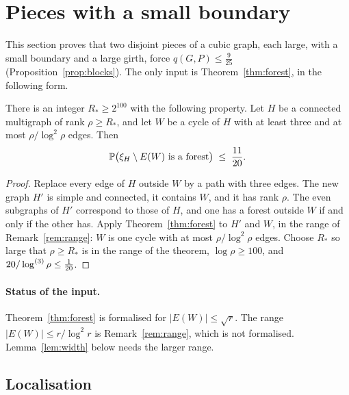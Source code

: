 \section{Pieces with a small boundary}\label{sec:affine}

This section proves that two disjoint pieces of a cubic graph, each large, with a small boundary and
a large girth, force $q(G,P)\le\frac9{25}$ (Proposition~\ref{prop:blocks}). The only input is
Theorem~\ref{thm:forest}, in the following form.

\begin{proposition}\label{prop:input}
There is an integer $R_{*}\ge2^{100}$ with the following property. Let $H$ be a connected multigraph
of rank $\rho\ge R_{*}$, and let $W$ be a cycle of $H$ with at least three and at most
$\rho/\log^{2}\rho$ edges. Then
\[
  \mathbb{P}\bigl(\xi_H\setminus E(W)\text{ is a forest}\bigr)\;\le\;\frac{11}{20}.
\]
\end{proposition}

\begin{proof}
Replace every edge of $H$ outside $W$ by a path with three edges. The new graph $H'$ is simple and
connected, it contains $W$, and it has rank $\rho$. The even subgraphs of $H'$ correspond to those
of $H$, and one has a forest outside $W$ if and only if the other has. Apply
Theorem~\ref{thm:forest} to $H'$ and $W$, in the range of Remark~\ref{rem:range}: $W$ is one cycle
with at most $\rho/\log^{2}\rho$ edges. Choose $R_{*}$ so large that $\rho\ge R_{*}$ is in the range
of the theorem, $\log\rho\ge100$, and $20/\log^{(3)}\rho\le\frac1{20}$.
\end{proof}

\paragraph{Status of the input.}
Theorem~\ref{thm:forest} is formalised for $|E(W)|\le\sqrt r$. The range $|E(W)|\le r/\log^{2}r$
is Remark~\ref{rem:range}, which is not formalised. Lemma~\ref{lem:width} below needs the larger
range.

\subsection{Localisation}

